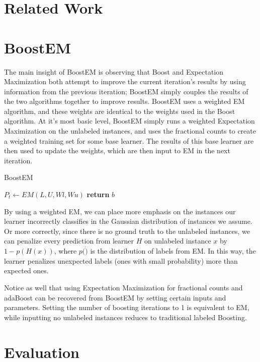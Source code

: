 \documentclass{sig-alternate}
\begin{document}
     
\section{Related Work}
\section{BoostEM}
The main insight of BoostEM is observing that Boost and Expectation Maximization both attempt to improve the current iteration's results by using information from the previous iteration; BoostEM simply couples the results of the two algorithms together to improve results.  BoostEM uses a weighted EM algorithm, and these weights are identical to the weights used in the Boost algorithm.  At it's most basic level, BoostEM simply runs a weighted Expectation Maximization on the unlabeled instances, and uses the fractional counts to create a weighted training set for some base learner.  The results of this base learner are then used to update the weights, which are then input to EM in the next iteration.

\begin{algorithm}
\caption{BoostEM}\label{euclid}
\begin{algorithmic}[1]
\State $P_{t} \gets EM(L,U,Wl,Wu)$
\EndFor
\State \textbf{return} $b$
\EndProcedure
\end{algorithmic}
\end{algorithm}

By using a weighted EM, we can place more emphasis on the instances our learner incorrectly classifies in the Gaussian distribution of instances we assume. Or more correctly, since there is no ground truth to the unlabeled instances, we can penalize every prediction from learner $H$ on unlabeled instance $x$ by $1-p(H(x))$, where $p(\dot)$ is the distribution of labels from EM.  In this way, the learner penalizes unexpected labels (ones with small probability) more than expected ones.

Notice as well that using Expectation Maximization for fractional counts and adaBoost can be recovered from BoostEM by setting certain inputs and parameters.  Setting the number of boosting iterations to 1 is equivalent to EM, while inputting no unlabeled instances reduces to traditional labeled Boosting.    
    
\section{Evaluation}
\end{document}
